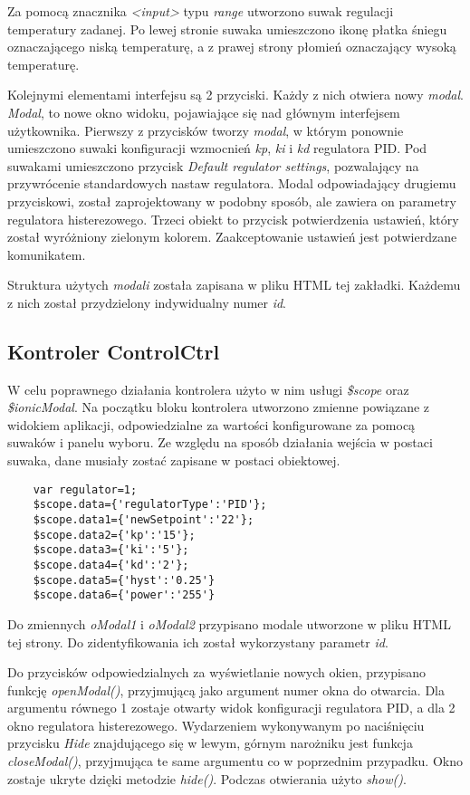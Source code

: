 Za pomocą znacznika \textit{<input>} typu \textit{range} utworzono suwak regulacji temperatury zadanej. Po lewej stronie suwaka umieszczono ikonę płatka śniegu oznaczającego niską temperaturę, a z prawej strony płomień oznaczający wysoką temperaturę.

Kolejnymi elementami interfejsu są 2 przyciski. Każdy z nich otwiera nowy \textit{modal}. \textit{Modal}, to nowe okno widoku, pojawiające się nad głównym interfejsem użytkownika. Pierwszy z przycisków tworzy \textit{modal}, w którym ponownie umieszczono suwaki konfiguracji wzmocnień \textit{kp}, \textit{ki} i \textit{kd} regulatora PID. Pod suwakami umieszczono przycisk \textit{Default regulator settings}, pozwalający na przywrócenie standardowych nastaw regulatora. Modal odpowiadający drugiemu przyciskowi, został zaprojektowany w podobny sposób, ale zawiera on parametry regulatora histerezowego. Trzeci obiekt to przycisk potwierdzenia ustawień, który został wyróżniony zielonym kolorem. Zaakceptowanie ustawień jest potwierdzane komunikatem.

Struktura użytych \textit{modali} została zapisana w pliku HTML tej zakładki. Każdemu z nich został przydzielony indywidualny numer \textit{id}.

\subsection{Kontroler ControlCtrl} %
W celu poprawnego działania kontrolera użyto w nim usługi \textit{\$scope} oraz \textit{\$ionicModal}. Na początku bloku kontrolera utworzono zmienne powiązane z widokiem aplikacji, odpowiedzialne za wartości konfigurowane za pomocą suwaków i panelu wyboru. Ze względu na sposób działania wejścia w postaci suwaka, dane musiały zostać zapisane w  postaci obiektowej.
\begin{lstlisting} 
	var regulator=1;
	$scope.data={'regulatorType':'PID'};
	$scope.data1={'newSetpoint':'22'};
	$scope.data2={'kp':'15'};
	$scope.data3={'ki':'5'};
	$scope.data4={'kd':'2'};
	$scope.data5={'hyst':'0.25'}
	$scope.data6={'power':'255'}
\end{lstlisting}
Do zmiennych \textit{oModal1} i \textit{oModal2} przypisano modale utworzone w pliku HTML tej strony. Do zidentyfikowania ich został wykorzystany parametr \textit{id}.

Do przycisków odpowiedzialnych za wyświetlanie nowych okien, przypisano funkcję \textit{openModal()}, przyjmującą jako argument numer okna do otwarcia. Dla argumentu równego 1 zostaje otwarty widok konfiguracji regulatora PID, a dla 2 okno regulatora histerezowego. Wydarzeniem wykonywanym po naciśnięciu przycisku \textit{Hide} znajdującego się w lewym, górnym narożniku jest funkcja \textit{closeModal()}, przyjmująca te same argumentu co w poprzednim przypadku. Okno zostaje ukryte dzięki metodzie \textit{hide()}. Podczas otwierania użyto \textit{show()}.

